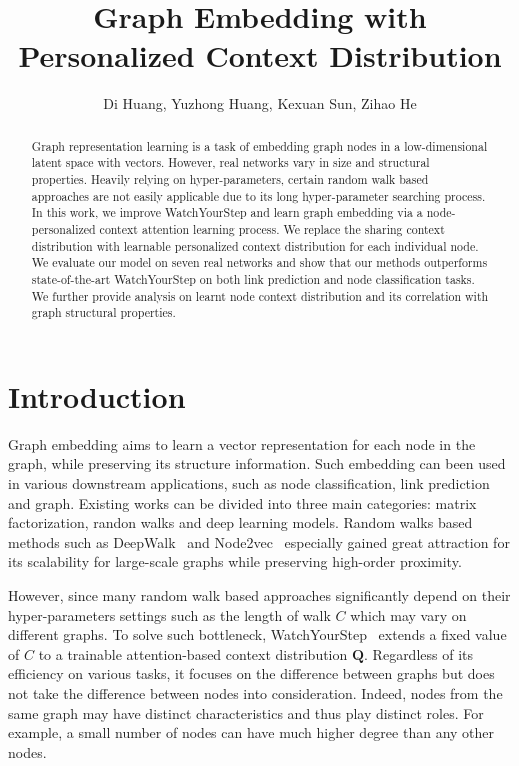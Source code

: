 \documentclass{article}
\title{Graph Embedding with Personalized Context Distribution}
\author{
Di Huang, Yuzhong Huang, Kexuan Sun, Zihao He}
\begin{document}
\maketitle

\begin{abstract}
Graph representation learning is a task of embedding graph nodes in a low-dimensional latent space with vectors. 
However, real networks vary in size and structural properties. Heavily relying on hyper-parameters, certain random walk based approaches are not easily applicable due to its long hyper-parameter searching process. In this work, we improve WatchYourStep and learn graph embedding via a node-personalized context attention learning process. We replace the sharing context distribution with learnable personalized context distribution for each individual node. We evaluate our model on seven real networks and show that our methods outperforms state-of-the-art WatchYourStep on both link prediction and node classification tasks. We further provide analysis on learnt node context distribution and its correlation with graph structural properties.
\end{abstract}

\section{Introduction}

Graph embedding aims to learn a vector representation for each node in the graph, while preserving its structure information. Such embedding can been used in various downstream applications, such as node classification, link prediction and graph. Existing works can be divided into three main categories\cite{}: matrix factorization, randon walks and deep learning models. Random walks based methods such as DeepWalk~\cite{perozzi2014deepwalk} and Node2vec~\cite{grover2016node2vec} especially gained great attraction for its scalability for large-scale graphs while preserving high-order proximity.

However, since many random walk based approaches significantly depend on their hyper-parameters settings such as the length of walk $C$ which may vary on different graphs. To solve such bottleneck, WatchYourStep~\cite{abu2018watch} extends a fixed value of $C$ to a trainable attention-based context distribution $\mathbf{Q}$. Regardless of its efficiency on various tasks, it focuses on the difference between graphs but does not take the difference between nodes into consideration. Indeed, nodes from the same graph may have distinct characteristics and thus play distinct roles. For example, a small number of nodes can have much higher degree than any other nodes.
\end{document}
